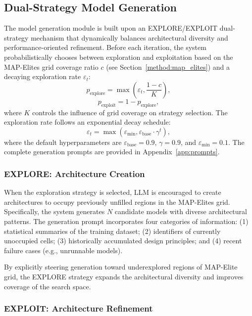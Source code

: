 \subsection{Dual-Strategy Model Generation}

The model generation module is built upon an EXPLORE/EXPLOIT dual-strategy mechanism that dynamically balances architectural diversity and performance-oriented refinement. Before each iteration, the system probabilistically chooses between exploration and exploitation based on the MAP-Elites grid coverage ratio $c$ (see Section~\ref{method:map_elites}) and a decaying exploration rate $\varepsilon_t$:
\begin{equation}
p_{\text{explore}} = \max\left(\varepsilon_t, \frac{1-c}{K}\right),
\end{equation}
\begin{equation}
p_{\text{exploit}} = 1 - p_{\text{explore}},
\end{equation}
where $K$ controls the influence of grid coverage on strategy selection. The exploration rate follows an exponential decay schedule:
\begin{equation}
\varepsilon_t = \max\left(\varepsilon_{\min}, \varepsilon_{\text{base}} \cdot \gamma^t\right),
\end{equation}
where the default hyperparameters are $\varepsilon_{\text{base}}=0.9$, $\gamma=0.9$, and $\varepsilon_{\min}=0.1$. The complete generation prompts are provided in Appendix~\ref{app:prompts}.

\subsubsection{EXPLORE: Architecture Creation}

When the exploration strategy is selected, LLM is encouraged to create architectures to occupy previously unfilled regions in the MAP-Elites grid. Specifically, the system generates $N$ candidate models with diverse architectural patterns. The generation prompt incorporates four categories of information: (1) statistical summaries of the training dataset; (2) identifiers of currently unoccupied cells; (3) historically accumulated design principles; and (4) recent failure cases (e.g., unrunnable models).

By explicitly steering generation toward underexplored regions of MAP-Elite grid, the EXPLORE strategy expands the architectural diversity and improves coverage of the search space.

\subsubsection{EXPLOIT: Architecture Refinement}

